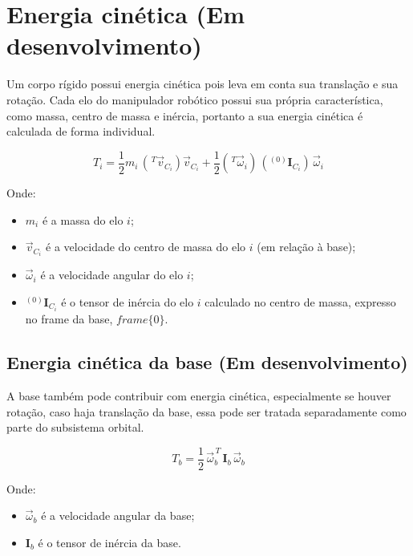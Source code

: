 \section{Energia cinética (Em desenvolvimento)}
Um corpo rígido possui energia cinética pois leva em conta sua translação e sua rotação. Cada elo do manipulador robótico possui sua própria característica, como massa, centro de massa e inércia, portanto a sua energia cinética é calculada de forma individual.

\begin{equation}
T_i =
\frac{1}{2} m_i \, ({}^{\,T} \vec{v}_{C_i}) \vec{v}_{C_i}
+ \frac{1}{2} ({}^{\,T} \vec{\omega}_i) \, ({}^{(0)} \mathbf{I}_{C_i}) \, \vec{\omega}_i
\end{equation}

Onde:
\begin{itemize}
    \item $m_i$ é a massa do elo $i$;
    \item $\vec{v}_{C_i}$ é a velocidade do centro de massa do elo $i$ (em relação à base);
    \item $\vec{\omega}_i$ é a velocidade angular do elo $i$;
    \item ${}^{(0)} \mathbf{I}_{C_i}$ é o tensor de inércia do elo $i$ calculado no centro de massa, expresso no frame da base, $frame \{0\}$.
\end{itemize}

\subsection{Energia cinética da base (Em desenvolvimento)}
A base também pode contribuir com energia cinética, especialmente se houver rotação, caso haja translação da base, essa pode ser tratada separadamente como parte do subsistema orbital.

\begin{equation}
T_b = \frac{1}{2} \, \vec{\omega}_b^{\,T} \, \mathbf{I}_b \, \vec{\omega}_b
\end{equation}

Onde:
\begin{itemize}
    \item $\vec{\omega}_b$ é a velocidade angular da base;
    \item $\mathbf{I}_b$ é o tensor de inércia da base.
\end{itemize}

